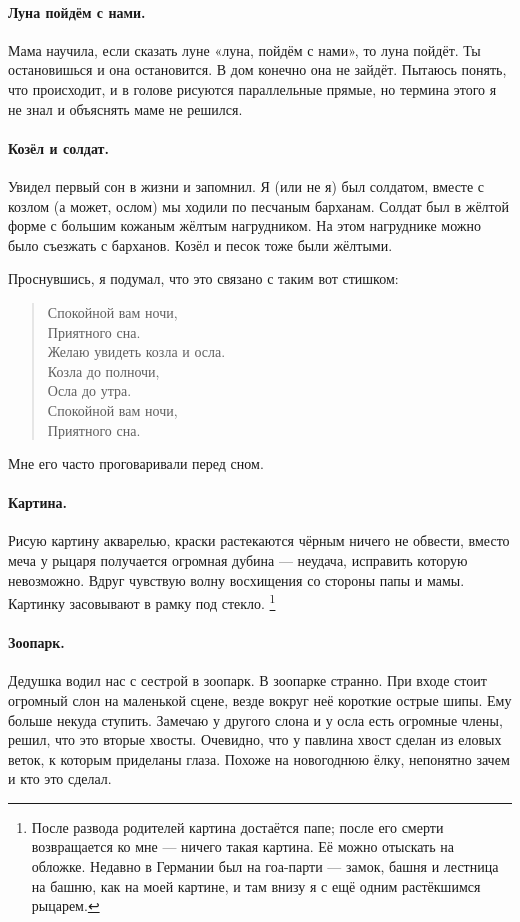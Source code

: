 \documentclass{book}
\begin{document}
\paragraph{Луна пойдём с нами.}
Мама научила, если сказать луне «луна, пойдём с нами», то луна пойдёт.
Ты остановишься и она остановится.
В дом конечно она не зайдёт.
Пытаюсь понять, что происходит, и в голове рисуются параллельные прямые, но термина этого я не знал и объяснять маме не решился.

\paragraph{Козёл  и солдат.}
Увидел первый сон в жизни и запомнил.
Я (или не я) был солдатом, вместе с козлом (а может, ослом) мы ходили по песчаным барханам.
Солдат был в жёлтой форме с большим кожаным жёлтым нагрудником.
На этом нагруднике можно было съезжать с барханов.
Козёл и песок тоже были жёлтыми.

Проснувшись, я подумал, что это связано с таким вот стишком:
\begin{verse}
Спокойной вам ночи,\\
Приятного сна.\\
Желаю увидеть козла и осла.\\
Козла до полночи,\\
Осла до утра.\\
Спокойной вам ночи,\\
Приятного сна.
\end{verse}
Мне его часто проговаривали перед сном.

\paragraph{Картина.}
Рисую картину акварелью, 
краски растекаются чёрным ничего не обвести,
вместо меча у рыцаря получается огромная дубина ---
неудача, исправить которую невозможно.
Вдруг чувствую волну восхищения со стороны папы и мамы.
Картинку засовывают в рамку под стекло.%
\footnote{После развода родителей картина достаётся папе;
после его смерти возвращается ко мне --- ничего такая картина.
Её можно отыскать на обложке.
Недавно в Германии был на гоа-парти --- замок, башня и лестница на башню, как на моей картине,
и там внизу я с ещё одним растёкшимся рыцарем.}

\paragraph{Зоопарк.}
Дедушка водил нас с сестрой в зоопарк.
В зоопарке странно.
При входе стоит огромный слон на маленькой сцене, везде вокруг неё короткие острые шипы. 
Ему больше некуда ступить.
Замечаю у другого слона и у осла есть огромные члены,
решил, что это вторые хвосты.
Очевидно, что у павлина хвост сделан из еловых веток, к которым приделаны глаза.
Похоже на новогоднюю ёлку, 
непонятно зачем и кто это сделал.
\end{document}
